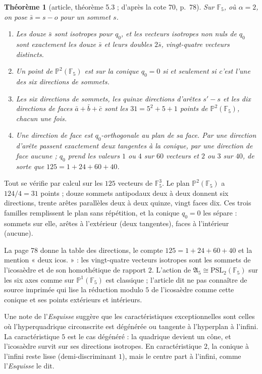 \documentclass[11pt,a4paper]{amsart}
\theoremstyle{definition}
\theoremstyle{plain}
\newtheorem{theoreme}{Théorème}
\theoremstyle{remark}
\newcommand{\F}{\mathbb F}
\begin{document}
\begin{theoreme}[article, théorème 5.3 ; d'après la cote 70, p.~78]
Sur $\F_5$, où $\alpha = 2$, on pose $\bar s = s - o$ pour un sommet $s$.
\begin{enumerate}
\item Les douze $\bar s$ sont isotropes pour $q_0$, et les vecteurs isotropes non nuls de $q_0$ sont exactement les douze $\bar s$ et leurs doubles $2\bar s$, vingt-quatre vecteurs distincts.
\item Un point de $\mathbb P^2(\F_5)$ est sur la conique $q_0 = 0$ si et seulement si c'est l'une des six directions de sommets.
\item Les six directions de sommets, les quinze directions d'arêtes $s' - s$ et les dix directions de faces $\bar a + \bar b + \bar c$ sont les $31 = 5^2 + 5 + 1$ points de $\mathbb P^2(\F_5)$, chacun une fois.
\item Une direction de face est $q_0$-orthogonale au plan de sa face. Par une direction d'arête passent exactement deux tangentes à la conique, par une direction de face aucune ; $q_0$ prend les valeurs $1$ ou $4$ sur $60$ vecteurs et $2$ ou $3$ sur $40$, de sorte que $125 = 1 + 24 + 60 + 40$.
\end{enumerate}
\end{theoreme}

Tout se vérifie par calcul sur les $125$ vecteurs de $\F_5^3$. Le plan $\mathbb P^2(\F_5)$ a $124/4 = 31$ points ; douze sommets antipodaux deux à deux donnent six directions, trente arêtes parallèles deux à deux quinze, vingt faces dix. Ces trois familles remplissent le plan sans répétition, et la conique $q_0 = 0$ les sépare : sommets sur elle, arêtes à l'extérieur (deux tangentes), faces à l'intérieur (aucune).

La page 78 donne la table des directions, le compte $125 = 1 + 24 + 60 + 40$ et la mention « deux icos. » : les vingt-quatre vecteurs isotropes sont les sommets de l'icosaèdre et de son homothétique de rapport $2$. L'action de $\mathfrak A_5 \cong \mathrm{PSL}_2(\F_5)$ sur les six axes comme sur $\mathbb P^1(\F_5)$ est classique ; l'article dit ne pas connaître de source imprimée qui lise la réduction modulo $5$ de l'icosaèdre comme cette conique et ses points extérieurs et intérieurs.

Une note de l'\emph{Esquisse} suggère que les caractéristiques exceptionnelles sont celles où l'hyperquadrique circonscrite est dégénérée ou tangente à l'hyperplan à l'infini. La caractéristique $5$ est le cas dégénéré : la quadrique devient un cône, et l'icosaèdre survit sur ses directions isotropes. En caractéristique $2$, la conique à l'infini reste lisse (demi-discriminant $1$), mais le centre part à l'infini, comme l'\emph{Esquisse} le dit.
\end{document}
